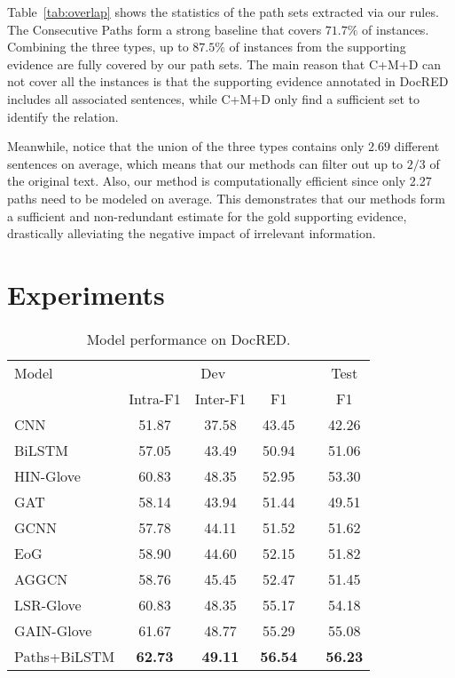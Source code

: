 \documentclass[11pt,a4paper]{article}
\begin{document}
Table~\ref{tab:overlap} shows the statistics of the path sets extracted via our rules. The Consecutive Paths form a strong baseline that covers $71.7\%$ of instances. Combining the three types, up to $87.5\%$ of instances from the supporting evidence are fully covered by our path sets. 
The main reason that C+M+D can not cover all the instances is that the supporting evidence annotated in DocRED includes all associated sentences, while C+M+D only find a sufficient set to identify the relation.


Meanwhile, notice that the union of the three types contains only $2.69$ different sentences on average, which means that our methods can filter out up to $2/3$ of the original text. Also, our method is computationally efficient since only 2.27 paths need to be modeled on average. This demonstrates that our methods form a sufficient and non-redundant estimate for the gold supporting evidence, drastically alleviating the negative impact of irrelevant information.



\section{Experiments}
\begin{table}[]
\setlength{\tabcolsep}{4pt}
\centering
\small
\begin{tabular}{lccclc}
\toprule
Model       & \multicolumn{3}{c}{Dev}     &  & Test  \\ \cmidrule{2-4} \cmidrule{6-6} 
            & Intra-F1 & Inter-F1 & F1    &  & F1    \\ \midrule
CNN         & 51.87    & 37.58    & 43.45 &  & 42.26 \\
BiLSTM      & 57.05    & 43.49    & 50.94 &  & 51.06 \\
HIN-Glove   & 60.83    & 48.35    & 52.95 &  & 53.30 \\ \midrule
GAT         & 58.14    & 43.94    & 51.44 &  & 49.51 \\ 
GCNN        & 57.78    & 44.11    & 51.52 &  & 51.62 \\
EoG         & 58.90    & 44.60    & 52.15 &  & 51.82 \\
AGGCN       & 58.76    & 45.45    & 52.47 &  & 51.45 \\
LSR-Glove   & 60.83    & 48.35    & 55.17 &  & 54.18 \\
GAIN-Glove  & 61.67    & 48.77    & 55.29 &  & 55.08 \\ \midrule
Paths+BiLSTM & \textbf{62.73}    & \textbf{49.11}    & \textbf{56.54} &  & \textbf{56.23} \\ \bottomrule
\end{tabular}
\caption{Model performance on DocRED.}
\label{tab:nn_res}
\vspace{-0.3cm}
\end{table}
\end{document}

